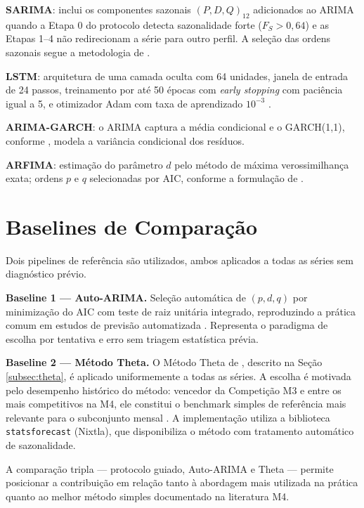 \documentclass[
  12pt,
  openright,
  twoside,
  a4paper,
  english,
  brazil
]{abntex2}
\begin{document}
\textbf{SARIMA}: inclui os componentes sazonais $(P, D, Q)_{12}$ adicionados ao ARIMA quando a Etapa 0 do protocolo detecta sazonalidade forte ($F_S > 0{,}64$) e as Etapas 1–4 não redirecionam a série para outro perfil. A seleção das ordens sazonais segue a metodologia de .

\textbf{LSTM}: arquitetura de uma camada oculta com 64 unidades, janela de entrada de 24 passos, treinamento por até 50 épocas com \textit{early stopping} com paciência igual a 5, e otimizador Adam com taxa de aprendizado $10^{-3}$ \cite{hochreiter1997long}.

\textbf{ARIMA-GARCH}: o ARIMA captura a média condicional e o GARCH(1,1), conforme , modela a variância condicional dos resíduos.

\textbf{ARFIMA}: estimação do parâmetro $d$ pelo método de máxima verossimilhança exata; ordens $p$ e $q$ selecionadas por AIC, conforme a formulação de .

\section{Baselines de Comparação}
\label{sec:baseline}

Dois pipelines de referência são utilizados, ambos aplicados a todas as séries sem diagnóstico prévio.

\textbf{Baseline 1 — Auto-ARIMA.} Seleção automática de $(p, d, q)$ por minimização do AIC com teste de raiz unitária integrado, reproduzindo a prática comum em estudos de previsão automatizada \cite{hyndman2018forecasting}. Representa o paradigma de escolha por tentativa e erro sem triagem estatística prévia.

\textbf{Baseline 2 — Método Theta.} O Método Theta de , descrito na Seção \ref{subsec:theta}, é aplicado uniformemente a todas as séries. A escolha é motivada pelo desempenho histórico do método: vencedor da Competição M3 e entre os mais competitivos na M4, ele constitui o benchmark simples de referência mais relevante para o subconjunto mensal \cite{makridakis2018m4results}. A implementação utiliza a biblioteca \texttt{statsforecast} (Nixtla), que disponibiliza o método com tratamento automático de sazonalidade.

A comparação tripla — protocolo guiado, Auto-ARIMA e Theta — permite posicionar a contribuição em relação tanto à abordagem mais utilizada na prática quanto ao melhor método simples documentado na literatura M4.
\end{document}
